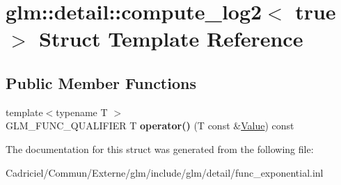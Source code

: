\hypertarget{structglm_1_1detail_1_1compute__log2_3_01true_01_4}{}\section{glm\+:\+:detail\+:\+:compute\+\_\+log2$<$ true $>$ Struct Template Reference}
\label{structglm_1_1detail_1_1compute__log2_3_01true_01_4}
\subsection*{Public Member Functions}
\begin{DoxyCompactItemize}
\item 
{\footnotesize template$<$typename T $>$ }\\G\+L\+M\+\_\+\+F\+U\+N\+C\+\_\+\+Q\+U\+A\+L\+I\+F\+I\+ER T {\bfseries operator()} (T const \&\hyperlink{document_8h_a071cf97155ba72ac9a1fc4ad7e63d481}{Value}) const \hypertarget{structglm_1_1detail_1_1compute__log2_3_01true_01_4_a4b8abe824c3c88324a640b5d88cbce99}{}\label{structglm_1_1detail_1_1compute__log2_3_01true_01_4_a4b8abe824c3c88324a640b5d88cbce99}

\end{DoxyCompactItemize}


The documentation for this struct was generated from the following file\+:\begin{DoxyCompactItemize}
\item 
Cadriciel/\+Commun/\+Externe/glm/include/glm/detail/func\+\_\+exponential.\+inl\end{DoxyCompactItemize}
